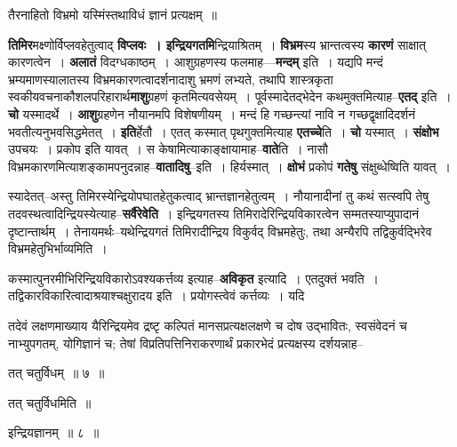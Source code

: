 \documentclass[article,12pt,a4paper]{memoir}
\begin{document}
	  \pstart {}तैरनाहितो विभ्रमो यस्मिंस्तथाविधं ज्ञानं प्रत्यक्षम् ॥
	\pend
      
	  \endgroup
	

	  \pstart \textbf{तिमिर}मक्ष्णोर्विप्लवहेतुत्वाद् \textbf{विप्लवः । इन्द्रियगतमि}न्द्रियाश्रितम् । \textbf{विभ्रम}स्य भ्रान्तत्वस्य \textbf{कारणं} साक्षात् कारणत्वेन । \textbf{अलातं} विदग्धकाष्ठम् । आशुग्रहणस्य फलमाह—\textbf{मन्दम्} इति । यद्यपि मन्दं भ्रम्यमाणस्यालातस्य विभ्रमकारणत्वादर्शनादाशु भ्रमणं लभ्यते, तथापि शास्त्रकृता स्वकीयवचनाकौशलपरिहारार्थ\textbf{माशु}ग्रहणं कृतमित्यवसेयम् । पूर्वस्मादेतद्भेदेन कथमुक्तमित्याह--\textbf{एतद्} इति । \textbf{चो} यस्मादर्थे । \textbf{आशु}ग्रहणेन नौयानमपि विशेषणीयम् । मन्दं हि गच्छन्त्यां नावि न गच्छद्वृक्षादिदर्शनं भवतीत्यनुभवसिद्धमेतत् । \textbf{इति}र्हेतौ । एतत् कस्मात् पृथगुक्तमित्याह \textbf{एतच्चे}ति । \textbf{चो} यस्मात् । \textbf{संक्षोभ} उपचयः । प्रकोप इति यावत् । स केषामित्याकाङ्क्षायामाह--\textbf{वाते}ति । नासौ विभ्रमकारणमित्याशङ्कामपनुदन्नाह--\textbf{वातादिषु}--इति । हिर्यस्मात् । \textbf{क्षोभं} प्रकोपं \textbf{गतेषु} संक्षुब्धेष्विति यावत् ।
	\pend
      

	  \pstart स्यादेतत्--अस्तु तिमिरस्येन्द्रियोपघातहेतुकत्वाद् भ्रान्तज्ञानहेतुत्वम् । नौयानादीनां तु कथं सत्स्वपि तेषु तदवस्थत्वादिन्द्रियस्येत्याह--\textbf{सर्वैरेवेति} । इन्द्रियगतस्य तिमिरादेरिन्द्रियविकारत्वेन सम्मतस्याप्युपादानं दृष्टान्तार्थम् । तेनायमर्थः--यथेन्द्रियगतं तिमिरादीन्द्रिय विकुर्वद् विभ्रमहेतुः, तथा अन्यैरपि तद्विकुर्वद्भिरेव विभ्रमहेतुभिर्भाव्यमिति ।
	\pend
      

	  \pstart कस्मात्पुनरमीभिरिन्द्रियविकारोऽवश्यकर्त्तव्य इत्याह--\textbf{अविकृत} इत्यादि । एतदुक्तं भवति । तद्विकारविकारित्वादाश्रयाश्चक्षुरादय इति । प्रयोग\leavevmode{}स्त्वेवं कर्त्तव्यः । यदि  \leavevmode{} 
	  
	तदेवं लक्षणमाख्याय यैरिन्द्रियमेव द्रष्टृ कल्पितं मानसप्रत्यक्षलक्षणे च दोष उद्भावितः, स्वसंवेदनं च नाभ्युपगतम्, योगिज्ञानं च; तेषां विप्रतिपत्तिनिराकरणार्थं प्रकारभेदं प्रत्यक्षस्य दर्शयन्नाह--  
	  
	तत् चतुर्विधम् ॥ ७ ॥ 
	  
	तत् चतुर्विधमिति ॥  
	  
	इन्द्रियज्ञानम् ॥ ८ ॥ 
	  
\end{document}
